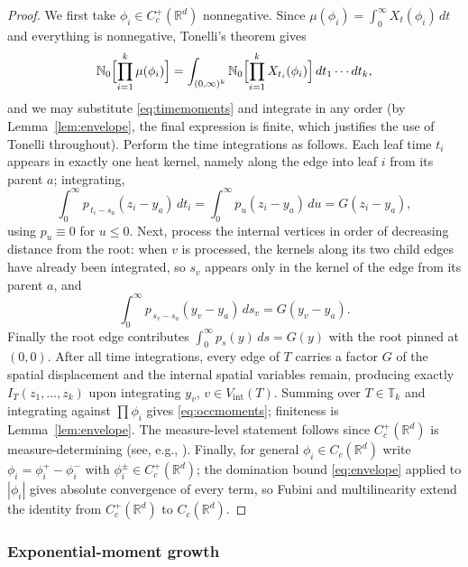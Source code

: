 \documentclass[11pt]{article}
\theoremstyle{definition}
\theoremstyle{remark}
\newcommand{\R}{\mathbb{R}}
\newcommand{\bN}{{\mathbb{N}_0}}                 %
\newcommand{\Cc}{C_c^+(\R^d)}
\newcommand{\Ccg}{C_c(\R^d)}                   %
\newcommand{\T}{\mathbb{T}}                    %
\numberwithin{equation}{section}
\theoremstyle{plain}
\theoremstyle{definition}
\theoremstyle{remark}
\theoremstyle{plain}
\begin{document}
\begin{proof}
We first take $\phi_i\in\Cc$ nonnegative.
Since $\mu(\phi_i)=\int_0^\infty X_{t}(\phi_i)\,dt$ and everything is
nonnegative, Tonelli's theorem gives
\[
\bN\Bigl[\prod_{i=1}^k\mu(\phi_i)\Bigr]
=\int_{(0,\infty)^k}\bN\Bigl[\prod_{i=1}^kX_{t_i}(\phi_i)\Bigr]
\,dt_1\cdots dt_k ,
\]
and we may substitute \eqref{eq:timemoments} and integrate in any order
(by Lemma~\ref{lem:envelope}, the final expression is finite, which justifies
the use of Tonelli throughout). Perform the time integrations as follows.
Each leaf time $t_i$ appears in exactly one heat kernel, namely along the
edge into leaf $i$ from its parent $a$; integrating,
\[
\int_0^\infty p_{\,t_i-s_a}(z_i-y_a)\,dt_i
=\int_0^\infty p_u(z_i-y_a)\,du=G(z_i-y_a),
\]
using $p_u\equiv0$ for $u\le0$. Next, process the internal vertices in order
of decreasing distance from the root: when $v$ is processed, the kernels
along its two child edges have already been integrated, so $s_v$ appears
only in the kernel of the edge from its parent $a$, and
\[
\int_{0}^\infty p_{\,s_v-s_a}(y_v-y_a)\,ds_v=G(y_v-y_a).
\]
Finally the root edge contributes $\int_0^\infty
p_{s}(y)\,ds=G(y)$ with the root pinned at $(0,0)$. After all time
integrations, every edge of $T$ carries a factor $G$ of the spatial
displacement and the internal spatial variables remain, producing exactly
$I_T(z_1,\dots,z_k)$ upon integrating $y_v$, $v\in V_{\mathrm{int}}(T)$.
Summing over $T\in\T_k$ and integrating against $\prod\phi_i$ gives
\eqref{eq:occmoments}; finiteness is Lemma~\ref{lem:envelope}. The
measure-level statement follows since $\Cc$ is measure-determining (see, e.g., \cite{Kall}).
Finally, for general $\phi_i\in\Ccg$ write
$\phi_i=\phi_i^+-\phi_i^-$ with $\phi_i^\pm\in\Cc$; the domination bound
\eqref{eq:envelope} applied to $|\phi_i|$ gives absolute convergence of every
term, so Fubini and multilinearity extend the identity from $\Cc$ to
$\Ccg$.
\end{proof}

\subsubsection{Exponential-moment growth}
\end{document}
